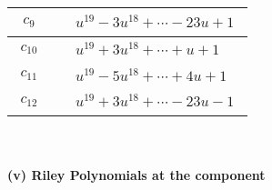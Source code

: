 \documentclass[1p]{elsarticle_modified}
\theoremstyle{definition}
\begin{document}
\begin{tabular}{m{50pt}|m{274pt}}
\hline $$\begin{aligned}c_{9}\end{aligned}$$&$\begin{aligned}
&u^{19}-3 u^{18}+\cdots-23 u+1
\end{aligned}$\\
\hline $$\begin{aligned}c_{10}\end{aligned}$$&$\begin{aligned}
&u^{19}+3 u^{18}+\cdots+u+1
\end{aligned}$\\
\hline $$\begin{aligned}c_{11}\end{aligned}$$&$\begin{aligned}
&u^{19}-5 u^{18}+\cdots+4 u+1
\end{aligned}$\\
\hline $$\begin{aligned}c_{12}\end{aligned}$$&$\begin{aligned}
&u^{19}+3 u^{18}+\cdots-23 u-1
\end{aligned}$\\
\hline
\end{tabular}\\~\\
\newpage\renewcommand{\arraystretch}{1}
\flushleft \textbf{(v) Riley Polynomials at the component}\newline \\
\end{document}
